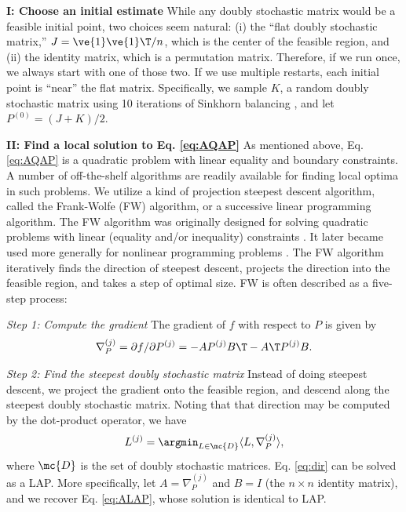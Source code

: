 \documentclass[10pt,journal,cspaper,compsoc]{IEEEtran}
\begin{document}
\textbf{I: Choose an initial estimate} While any doubly stochastic matrix would be a feasible initial point, two choices seem natural: (i) the ``flat doubly  stochastic matrix,'' $J=\ve{1} \ve{1}\T/n$, which is the center of the feasible region, and (ii) the identity matrix, which is a permutation matrix.  Therefore, if we run \qap  once, we always start with one of those two.  If we use multiple restarts, each initial point is ``near'' the flat matrix.  Specifically, we sample $K$, a random doubly stochastic matrix using 10 iterations of Sinkhorn balancing \cite{Sinkhorn1964}, and let $P^{(0)}=(J+K)/2$. %


\textbf{II: Find a local solution to Eq. \eqref{eq:AQAP}} As mentioned above, Eq. \eqref{eq:AQAP} is a quadratic problem with linear equality and boundary constraints.  A number of off-the-shelf algorithms are readily available for finding local optima in such problems.  We utilize a kind of projection steepest descent algorithm, called the 
Frank-Wolfe (FW) algorithm, or a successive linear programming algorithm.  The FW algorithm was originally designed for solving quadratic problems with linear (equality and/or inequality) constraints \cite{Frank1956}. It later became used more generally for nonlinear programming problems \cite{Bradley1977}.  The FW algorithm iteratively finds the direction of steepest descent, projects the direction into the feasible region, and takes a step of optimal size.  FW is often described as a five-step process:

\emph{Step 1: Compute the gradient} The gradient of $f$ with respect to $P$ is given by
\begin{align} \label{eq:grad}
	\nabla_P^{(j)} = \partial f / \partial P^{(j)} =  - A P^{(j)} B\T - A\T P^{(j)} B.
\end{align}


\emph{Step 2: Find the steepest doubly stochastic matrix} Instead of doing steepest descent, we project the gradient onto the feasible region, and descend along the steepest doubly stochastic matrix. Noting that that direction may be computed by the dot-product operator, we have
\begin{align}\label{eq:dir}
	L^{(j)} = \argmin_{L \in \mc{D}} \langle L, \nabla_P^{(j)} \rangle, %
\end{align}
where $\mc{D}$ is the set of doubly stochastic matrices.  Eq. \eqref{eq:dir} can be solved as a LAP.  More specifically, let $A=\nabla_P^{(j)}$ and $B=I$ (the $n\times n$ identity matrix), and we recover Eq. \eqref{eq:ALAP}, whose solution is identical to LAP.
\end{document}
